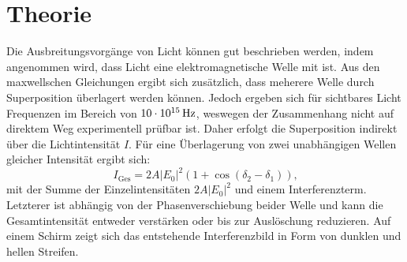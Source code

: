 
\section{Theorie}
\label{sec:Theorie}
Die Ausbreitungsvorgänge von Licht können gut beschrieben werden, indem angenommen
wird, dass Licht eine elektromagnetische Welle mit ist. Aus den maxwellschen Gleichungen
ergibt sich zusätzlich, dass meherere Welle durch Superposition überlagert werden können.
Jedoch ergeben sich für sichtbares Licht Frequenzen im Bereich von $\SI{10 E15}{\hertz}$,
weswegen der Zusammenhang nicht auf direktem Weg experimentell prüfbar ist. Daher
erfolgt die Superposition indirekt über die Lichtintensität $I$. Für eine Überlagerung von zwei unabhängigen Wellen gleicher Intensität ergibt sich:
\begin{equation}
  I_\text{Ges} = 2 A | E_0 |^2 \left(1 + \cos(\delta_2 - \delta_1) \right)\text{,}
\end{equation}
mit der Summe der Einzelintensitäten $2 A | E_0 |^2$ und einem Interferenzterm. Letzterer
ist abhängig von der Phasenverschiebung beider Welle und kann die Gesamtintensität entweder verstärken oder bis zur Auslöschung reduzieren.
Auf einem Schirm zeigt sich das entstehende Interferenzbild in Form von dunklen und hellen Streifen.

